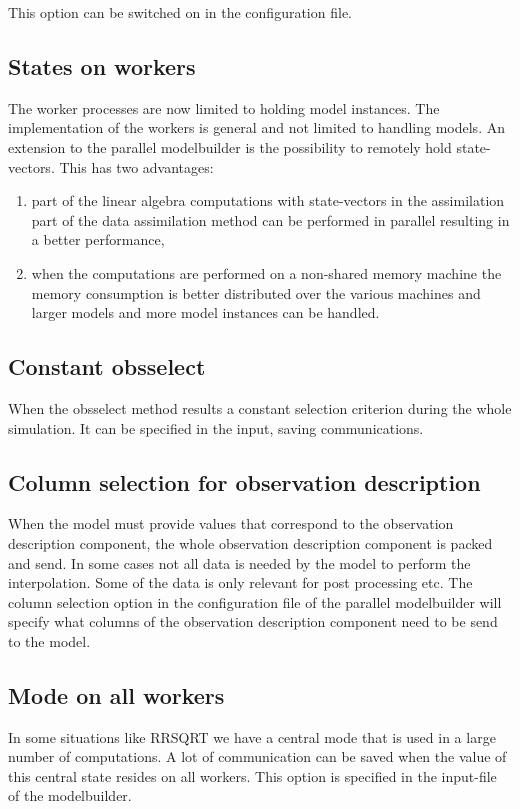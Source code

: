 This option can be switched on in the configuration file.

\subsection{States on workers}
The worker processes are now limited to holding model instances. The
implementation of the workers is general and not limited to handling
models. An extension to the parallel modelbuilder is the possibility to
remotely hold state-vectors.  This has two advantages:
\begin{enumerate}
\item part of the linear algebra computations with state-vectors in the
assimilation part of the data assimilation method can be performed
in parallel resulting in a better performance,
\item when the computations are performed on a non-shared memory machine
the memory consumption is better distributed over the various machines and
larger models and more model instances can be handled. 
\end{enumerate}

\subsection{Constant obsselect}
When the obsselect method results a constant selection criterion during the
whole simulation. It can be specified in the input, saving communications.


\subsection{Column selection for observation description}
When the model must provide values that correspond to the observation
description component, the whole observation description component is
packed and send. In some cases not all data is needed by the model to
perform the interpolation. Some of the data is only relevant for post
processing etc. The column selection option in the configuration file of
the parallel modelbuilder will specify what columns of the observation
description component need to be send to the model.

\subsection{Mode on all workers}
In some situations like RRSQRT we have a central mode that is used in a
large number of computations. A lot of communication can be saved when the
value of this central state resides on all workers. This option is
specified in the input-file of the modelbuilder.


